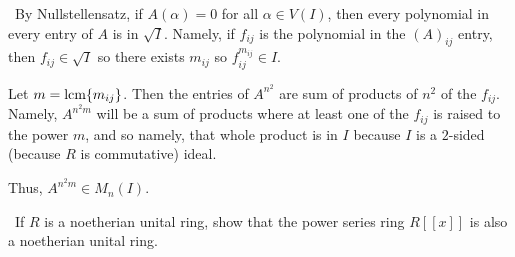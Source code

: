 \documentclass[12pt]{Qual}
\begin{document}
\begin{solution}$\,$
By Nullstellensatz, if $A(\alpha)=0$ for all $\alpha\in V(I)$, then every polynomial in every entry of $A$ is in $\sqrt{I}$. Namely, if $f_{ij}$ is the polynomial in the $(A)_{ij}$ entry, then $f_{ij}\in\sqrt{I}$ so there exists $m_{ij}$ so $f_{ij}^{m_{ij}}\in I$.

Let $m=\text{lcm}\{m_{ij}\}$. Then the entries of $A^{n^2}$ are sum of products of $n^2$ of the $f_{ij}$. Namely, $A^{n^2m}$ will be a sum of products where at least one of the $f_{ij}$ is raised to the power $m$, and so namely, that whole product is in $I$ because $I$ is a $2$-sided (because $R$ is commutative) ideal.

Thus, $A^{n^2m}\in M_n(I).$
\end{solution}
\newpage


\begin{problem} $\,$
If $R$ is a noetherian unital ring, show that the power series ring $R[[x]]$ is also a noetherian unital ring.
\end{problem}
\end{document}
